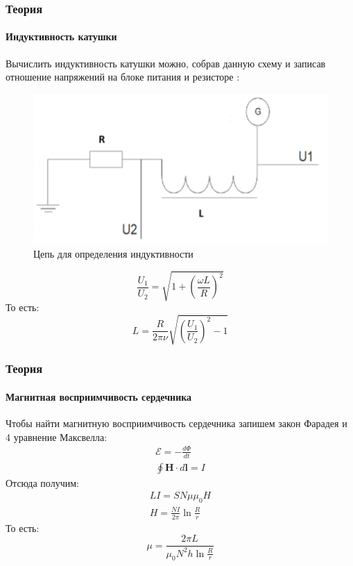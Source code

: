 \documentclass[8pt,pdf,hyperref={unicode}]{beamer}
\newcommand{\EDS}{\ensuremath{\mathscr{E}}} %
\begin{document}
	\begin{frame}
		\frametitle{Теория} 
		\framesubtitle{Индуктивность катушки}
		\begin{center}
				Вычислить индуктивность катушки можно, собрав данную схему и записав отношение напряжений на блоке питания и резисторе : 
				\begin{figure}[h!]
					\centering
					\includegraphics[width=.5\linewidth]{схема1.png}
					\caption{Цепь для определения индуктивности}
					\label{fig:1}
				\end{figure}
				\begin{equation}
				\frac{U_1}{U_2} = \sqrt{1 + (\frac{\omega L}{R})^2}
				\end{equation}
				То есть:
				\begin{equation}
					L = \frac{R}{2 \pi \nu}\sqrt{(\frac{U_1}{U_2})^2 - 1}
				\end{equation}
		\end{center}
	\end{frame}

	\begin{frame}
		\frametitle{Теория} 
		\framesubtitle{Магнитная восприимчивость сердечника}
		\begin{center}
			Чтобы найти магнитную восприимчивость сердечника запишем закон Фарадея и 4 уравнение Максвелла:
			\begin{equation}
			\begin{gathered}
			\EDS = -\frac{d\Phi}{dt}\\
			\oint\limits\mathbf{H}\cdot d\mathbf{l} = I
			\end{gathered}
			\end{equation}
			Отсюда получим:
			\begin{equation}
			\begin{gathered}
			L I = S N \mu \mu_0 H\\
			H = \frac{N I}{2 \pi} \ln{\frac{R}{r}}
			\end{gathered}
			\end{equation}
			То есть:
			\begin{equation}
			\mu = \frac{2 \pi L}{ \mu_0 N^2 h \ln{\frac{R}{r}}}
			\end{equation}
		\end{center}
	\end{frame}
	
\end{document}
